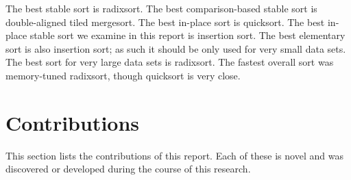 
The best stable sort is radixsort. The best comparison-based stable sort is
double-aligned tiled mergesort. The best in-place sort is quicksort. The best in-place
stable sort we examine in this report is insertion sort. The best elementary
sort is also insertion sort; as such it should be only used for very small data
sets. The best sort for very large data sets is radixsort. The fastest overall
sort was memory-tuned radixsort, though quicksort is very close.


\section{Contributions}


This section lists the contributions of this report. Each of these is novel  
and was discovered or developed during the course of this research.

